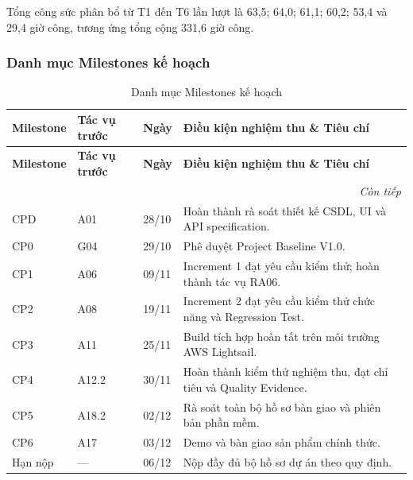 Tổng công sức phân bổ từ T1 đến T6 lần lượt là 63,5; 64,0; 61,1; 60,2; 53,4 và 29,4 giờ công, tương ứng tổng cộng 331,6 giờ công.

\subsubsection{Danh mục Milestones kế hoạch}
\begingroup\small
\setlength{\tabcolsep}{4pt}\renewcommand{\arraystretch}{1.15}
\begin{longtable}{@{}p{.13\linewidth}p{.13\linewidth}p{.10\linewidth}p{.505\linewidth}@{}}
\caption{Danh mục Milestones kế hoạch}\label{tab:milestones}\\
\toprule
\textbf{Milestone} & \textbf{Tác vụ trước} & \textbf{Ngày} & \textbf{Điều kiện nghiệm thu \& Tiêu chí} \\
\midrule\endfirsthead
\toprule
\textbf{Milestone} & \textbf{Tác vụ trước} & \textbf{Ngày} & \textbf{Điều kiện nghiệm thu \& Tiêu chí} \\
\midrule\endhead
\midrule\multicolumn{4}{r}{\textit{Còn tiếp}}\\\endfoot
\bottomrule\endlastfoot
CPD & A01 & 28/10 & Hoàn thành rà soát thiết kế CSDL, UI và API specification. \\
CP0 & G04 & 29/10 & Phê duyệt Project Baseline V1.0. \\
CP1 & A06 & 09/11 & Increment 1 đạt yêu cầu kiểm thử; hoàn thành tác vụ RA06. \\
CP2 & A08 & 19/11 & Increment 2 đạt yêu cầu kiểm thử chức năng và Regression Test. \\
CP3 & A11 & 25/11 & Build tích hợp hoàn tất trên môi trường AWS Lightsail. \\
CP4 & A12.2 & 30/11 & Hoàn thành kiểm thử nghiệm thu, đạt chỉ tiêu và Quality Evidence. \\
CP5 & A18.2 & 02/12 & Rà soát toàn bộ hồ sơ bàn giao và phiên bản phần mềm. \\
CP6 & A17 & 03/12 & Demo và bàn giao sản phẩm chính thức. \\
Hạn nộp & --- & 06/12 & Nộp đầy đủ bộ hồ sơ dự án theo quy định. \\
\end{longtable}\endgroup
